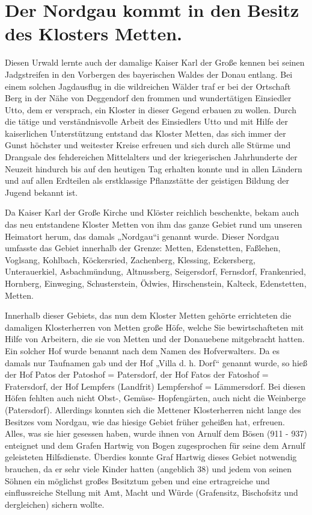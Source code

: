 \documentclass[12pt,a4paper]{book}
\begin{document}
\chapter{Der Nordgau kommt in den Besitz des Klosters Metten.}

Diesen Urwald lernte auch der damalige Kaiser Karl der Große kennen bei seinen
Jadgstreifen in den Vorbergen des bayerischen Waldes der Donau entlang. Bei
einem solchen Jagdausflug in die wildreichen Wälder traf er bei der Ortschaft
Berg in der Nähe von Deggendorf den frommen und wundertätigen Einsiedler Utto,
dem er versprach, ein Kloster in dieser Gegend erbauen zu wollen. Durch die
tätige und verständnisvolle Arbeit des Einsiedlers Utto und mit Hilfe der
kaiserlichen Unterstützung entstand das Kloster Metten, das sich immer der Gunst
höchster und weitester Kreise erfreuen und sich durch alle Stürme und Drangsale
des fehdereichen Mittelalters und der kriegerischen Jahrhunderte der Neuzeit
hindurch bis auf den heutigen Tag erhalten konnte und in allen Ländern und auf
allen Erdteilen als erstklassige Pflanzstätte der geistigen Bildung der Jugend
bekannt ist.

Da Kaiser Karl der Große Kirche und Klöster reichlich beschenkte, bekam auch das
neu entstandene Kloster Metten von ihm das ganze Gebiet rund um unseren
Heimatort herum, das damals „Nordgau“i genannt wurde. Dieser Nordgau umfasste
das Gebiet innerhalb der Grenze: Metten, Edenstetten, Faßlehen, Voglsang,
Kohlbach, Köckersried, Zachenberg, Klessing, Eckersberg, Unterauerkiel,
Asbachmündung, Altnussberg, Seigersdorf, Fernsdorf, Frankenried, Hornberg,
Einweging, Schusterstein, Ödwies, Hirschenstein, Kalteck, Edenstetten, Metten.

Innerhalb dieser Gebiets, das nun dem Kloster Metten gehörte errichteten die
damaligen Klosterherren von Metten große Höfe, welche Sie bewirtschafteten mit
Hilfe von Arbeitern, die sie von Metten und der Donauebene mitgebracht hatten.
Ein solcher Hof wurde benannt nach dem Namen des Hofverwalters. Da es damals nur
Taufnamen gab und der Hof „Villa d. h. Dorf“ genannt wurde, so hieß der Hof
Patos der Patoshof = Patersdorf, der Hof Fatos der Fatoshof = Fratersdorf, der
Hof Lempfers (Landfrit) Lempfershof = Lämmersdorf. Bei diesen Höfen fehlten auch
nicht Obst-, Gemüse- Hopfengärten, auch nicht die Weinberge (Patersdorf).
Allerdings konnten sich die Mettener Klosterherren nicht lange des Besitzes vom
Nordgau, wie das hiesige Gebiet früher geheißen hat, erfreuen. Alles, was sie
hier gesessen haben, wurde ihnen von Arnulf dem Bösen (911 - 937) enteignet und
dem Grafen Hartwig von Bogen zugesprochen für seine dem Arnulf geleisteten
Hilfsdienste. Überdies konnte Graf Hartwig dieses Gebiet notwendig brauchen, da
er sehr viele Kinder hatten (angeblich 38) und jedem von seinen Söhnen ein
möglichst großes Besitztum geben und eine ertragreiche und einflussreiche
Stellung mit Amt, Macht und Würde (Grafensitz, Bischofsitz und dergleichen)
sichern wollte.
\end{document}
